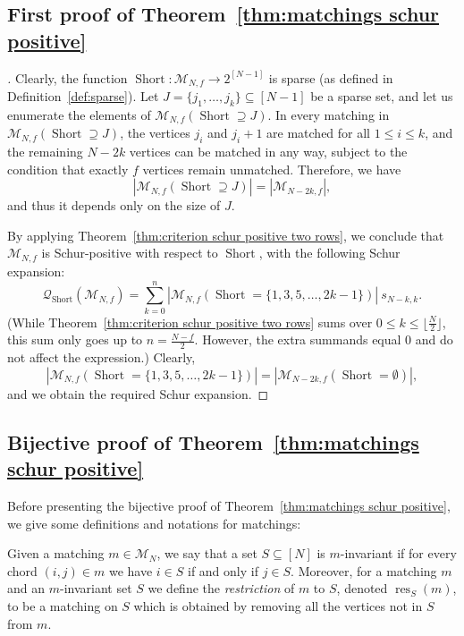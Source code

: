 \documentclass[ALCO]{cedram}
\newcommand{\Short}{\operatorname{Short}}
\newcommand{\res}{\operatorname{res}}
\newcommand{\Q}{\mathcal{Q}}
\newcommand{\M}{\mathcal{M}}
\begin{document}
\subsection{First proof of Theorem~\ref{thm:matchings schur positive}}
\begin{proof}[\unskip\nopunct]
    Clearly, the function $\Short: \M_{N,f} \to 2^{[N-1]}$ is sparse (as defined in Definition~\ref{def:sparse}). Let $J = \{j_1, \dots, j_k\} \subseteq [N-1]$ be a sparse set, and let us enumerate the elements of $\M_{N,f}(\Short \supseteq J)$. In every matching in $\M_{N,f}(\Short \supseteq J)$, the vertices $j_i$ and $j_i + 1$ are matched for all $1 \le i \le k$, and the remaining $N-2k$ vertices can be matched in any way, subject to the condition that exactly $f$ vertices remain unmatched. Therefore, we have
    \[
        |\M_{N,f}(\Short \supseteq J)| = |\M_{N-2k,f}|,
    \]
    and thus it depends only on the size of $J$.

    By applying Theorem~\ref{thm:criterion schur positive two rows}, we conclude that $\M_{N,f}$ is Schur-positive with respect to $\Short$, with the following Schur expansion:
    \[
        \Q_{\Short} (\M_{N,f}) = \sum_{k=0}^n |\M_{N,f}(\Short = \{1,3,5,\dots, 2k-1\})|\ s_{N-k,k}.
    \]
    (While Theorem~\ref{thm:criterion schur positive two rows} sums over $0 \le k \le \lfloor\frac{N}{2} \rfloor$, this sum only goes up to $n = \frac{N-f}{2}$. However, the extra summands equal 0 and do not affect the expression.) Clearly,
    \[
        |\M_{N,f}(\Short = \{1,3,5,\dots, 2k-1\})| = |\M_{N-2k,f}(\Short = \emptyset)|,
    \]
    and we obtain the required Schur expansion.
\end{proof}

\subsection{Bijective proof of Theorem~\ref{thm:matchings schur positive}}
\label{subsec:bijective proof matchings schur positive}

Before presenting the bijective proof of Theorem~\ref{thm:matchings schur positive}, we give some definitions and notations for matchings:






\begin{definition}
\label{def:restriction of matching}
    Given a matching $m \in \M_N$, we say that a set $S \subseteq [N]$ is $m$-invariant if for every chord $(i,j) \in m$ we have $i \in S$ if and only if $j \in S$. Moreover, for a matching $m$ and an $m$-invariant set $S$ we define the \emph{restriction} of $m$ to $S$, denoted $\res_S(m)$, to be a matching on $S$ which is obtained by removing all the vertices not in $S$ from $m$.
\end{definition}
\end{document}
